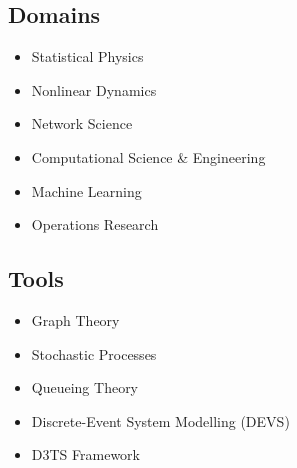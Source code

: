 \subsection*{Domains}
\begin{itemize}
\item Statistical Physics
\item Nonlinear Dynamics
\item Network Science
\item Computational Science & Engineering
\item Machine Learning
\item Operations Research
\end{itemize}

\subsection*{Tools}
\begin{itemize}
\item Graph Theory
\item Stochastic Processes
\item Queueing Theory
\item Discrete-Event System Modelling (DEVS)
\item D3TS Framework
\end{itemize}